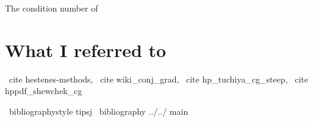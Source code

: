 
The condition number of%









\section{What I referred to}

\ cite {hestenes-methods}, \ cite {wiki_conj_grad}, \ cite {hp_tuchiya_cg_steep}, \ cite {hppdf_shewchek_cg}

\ bibliographystyle {tipsj}
\ bibliography {../../ main}
\fi



